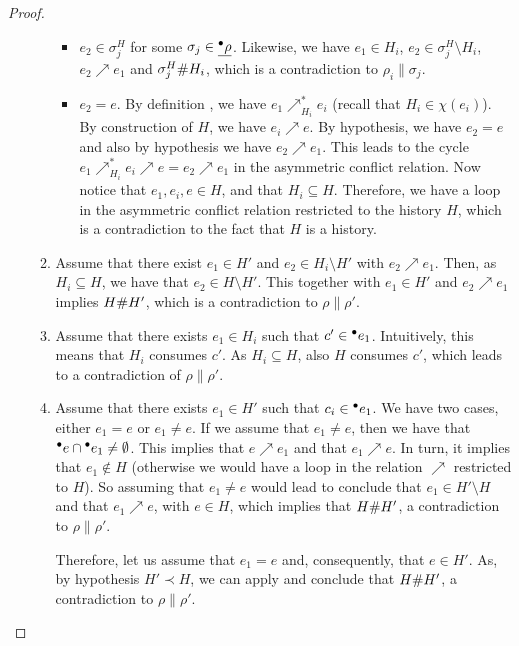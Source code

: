 \begin{proof}
\begin{enumerate}[(a)]
\begin{enumerate}[1.]
\begin{itemize}
\item $e_2 \in \sigma^H_j$ for some $\sigma_j \in \underline{{}^\bullet\rho}$.  Likewise,
we have $e_1 \in H_i$, $e_2 \in \sigma^H_j \setminus H_i$, $e_2 \nearrow e_1$
and $\sigma^H_j \mathord{\#} H_i$, which is a contradiction to $\rho_i \parallel
\sigma_j$.

\item $e_2 = e$.  By definition , we have $e_1 \nearrow^*_{H_i}
e_i$ (recall that $H_i \in \chi(e_i)$).  By construction of $H$, we have $e_i
\nearrow e$.  By hypothesis, we have $e_2 = e$ and also by hypothesis we have
$e_2 \nearrow e_1$.  This leads to the cycle $e_1 \nearrow^*_{H_i} e_i \nearrow
e = e_2 \nearrow e_1$ in the asymmetric conflict relation.  Now notice that
$e_1, e_i, e \in H$, and that $H_i \subseteq H$.  Therefore, we have a loop in
the asymmetric conflict relation restricted to the history $H$, which is a
contradiction to the fact that $H$ is a history.
\end{itemize}

\item Assume that there exist $e_1 \in H'$ and $e_2 \in H_i \setminus H'$ with
$e_2 \nearrow e_1$.  Then, as $H_i \subseteq H$, we have that $e_2 \in H
\setminus H'$.  This together with $e_1 \in H'$ and $e_2 \nearrow e_1$ implies
$H \mathord{\#} H'$, which is a contradiction to $\rho \parallel \rho'$.

\item Assume that there exists $e_1 \in H_i$ such that $c' \in {}^\bullet e_1$.
Intuitively, this means that $H_i$ consumes $c'$.  As $H_i \subseteq H$, also
$H$ consumes $c'$, which leads to a contradiction of $\rho \parallel \rho'$.

\item Assume that there exists $e_1 \in H'$ such that $c_i \in {}^\bullet e_1$.  We
have two cases, either $e_1 = e$ or $e_1 \not= e$.  If we assume that $e_1
\not= e$, then we have that ${}^\bullet e \cap {}^\bullet e_1 \not= \emptyset$.  This
implies that $e \nearrow e_1$ and that $e_1 \nearrow e$.  In turn, it implies
that $e_1 \notin H$ (otherwise we would have a loop in the relation $\nearrow$
restricted to $H$).  So assuming that $e_1 \not= e$ would lead to conclude that
$e_1 \in H' \setminus H$ and that $e_1 \nearrow e$, with $e \in H$, which
implies that $H \mathord{\#} H'$, a contradiction to $\rho \parallel \rho'$.

Therefore, let us assume that $e_1 = e$ and, consequently, that $e \in H'$.
As, by hypothesis $H' \prec H$, we can apply  and conclude
that $H \mathord{\#} H'$, a contradiction to $\rho \parallel \rho'$.
\end{enumerate}


\end{enumerate}
\end{proof}
